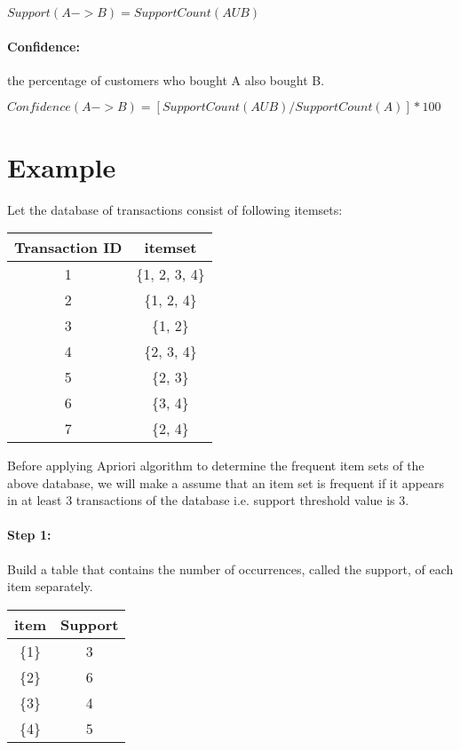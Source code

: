 \documentclass{book}
\begin{document}
    \begin{center}$Support(A -> B) = SupportCount(A U B)$\end{center}

\paragraph{Confidence:} the percentage of customers who bought A also bought B.
    \begin{center}$Confidence(A -> B) = [SupportCount(A U B) / SupportCount(A)] * 100 $\end{center}

\section*{Example}

Let the database of transactions consist of following itemsets:

\begin{center}
    \begin{tabular}{|c|c|}
        \hline
        \textbf{Transaction ID} & \textbf{itemset}\\
        \hline
          1 & \{1, 2, 3, 4\} \\
          2 & \{1, 2, 4\} \\
          3 & \{1, 2\} \\
          4 & \{2, 3, 4\} \\
          5 & \{2, 3\} \\
          6 & \{3, 4\} \\
          7 & \{2, 4\} \\
        \hline
    \end{tabular}
\end{center}

Before applying Apriori algorithm to determine the frequent item sets of the above database, we will make a assume that an item set is frequent if it appears in at least 3 transactions of the database i.e. support threshold value is 3.

\paragraph{Step 1:} Build a table that contains the number of occurrences, called the support, of each item separately.

\begin{center}
    \begin{tabular}{|c|c|}
        \hline
        \textbf{item} & \textbf{Support} \\
        \hline
        \{1\} & 3 \\
        \{2\} & 6 \\
        \{3\} & 4 \\
        \{4\} & 5 \\
        \hline
    \end{tabular}
\end{center}
\end{document}
